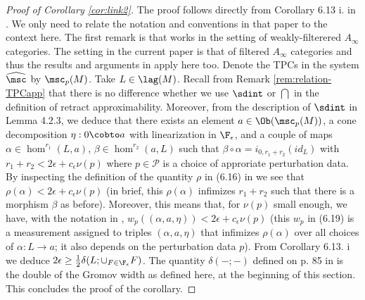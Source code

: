 \begin{proof}[Proof of Corollary \ref{cor:link2}] The proof follows directly from Corollary 6.13 i.  in \cite{Bi-Co-Sh:LagrSh}. We only need to relate the notation and conventions in that paper to the context here. The first remark is that \cite{Bi-Co-Sh:LagrSh} works in the setting of weakly-filterered $A_{\infty}$ categories. The setting in the current paper
is that of filtered $A_{\infty}$ categories and thus the results and arguments in \cite{Bi-Co-Sh:LagrSh} apply here too.  
Denote the  TPCs in the system $\widehat{\msc}$ by $\msc_{p}(M)$. Take $L\in\lag(M)$. 
Recall from Remark \ref{rem:relation-TPCapp} that there is no difference whether we use $\sdint$ or 
$\dint$ in the definition of retract approximability. Moreover, from the description of $\sdint$ 
in Lemma 4.2.3, we deduce that there exists an element $a\in \Ob(\msc_{p}(M))$, a cone decomposition
$\eta: 0\cobto a$ with linearization in $\F_{\epsilon}$, and a couple of maps $\alpha\in \hom^{r_{1}}(L, a)$, $\beta\in \hom^{r_{2}}(a,L)$ such that $\beta\circ \alpha = i_{0,r_{1}+r_{2}}(id_{L})$ with $r_{1}+r_{2} < 2\epsilon +c_{\epsilon}\nu(p)$ where $p\in\mathcal{P}$ is
a choice of approriate perturbation data. By inspecting the definition of the quantity $\rho$ in (6.16) in \cite{Bi-Co-Sh:LagrSh} we see 
that $\rho(\alpha) < 2\epsilon + c_{\epsilon}\nu(p)$ (in brief, this $\rho(\alpha)$ infimizes $r_{1}+r_{2}$ such that there is a morphism $\beta$ as before). Moreover, this means that, for $\nu(p)$ small enough, we have, 
with the notation in \cite{Bi-Co-Sh:LagrSh}, $w_{p}( (\alpha, a,\eta)) < 2\epsilon +c_{\epsilon}\nu(p)$ (this $w_{p}$ in (6.19)
\cite{Bi-Co-Sh:LagrSh} is a measurement assigned to triples $(\alpha, a, \eta)$ that infimizes $\rho (\alpha)$ over all choices of $\alpha : L\to a$; it also depends on the perturbation data $p$).  From 
Corollary 6.13. i \cite{Bi-Co-Sh:LagrSh} we 
deduce $2\epsilon \geq \frac{1}{2}\delta (L; \cup_{F\in \F_{\epsilon}}F)$. The quantity $\delta (-;-)$
defined on p. 85 in \cite{Bi-Co-Sh:LagrSh} is the double of the Gromov width as defined here, at the beginning of 
this section. This concludes the proof of the corollary.   
\end{proof}

